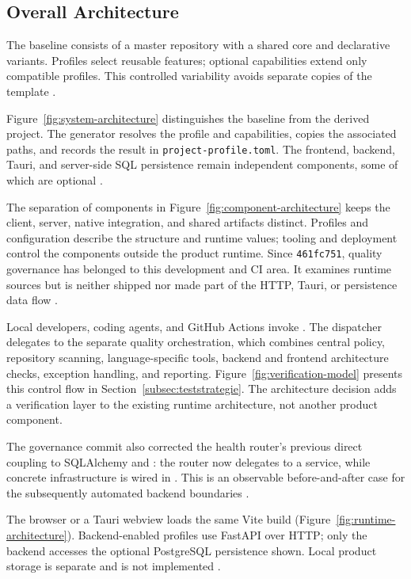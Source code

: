 \subsection{Overall Architecture}
\label{subsec:gesamtarchitektur}

The baseline consists of a master repository with a shared core and declarative
variants. Profiles select reusable features; optional capabilities extend only
compatible profiles. This controlled variability avoids separate copies of the
template
\parencite{clements2001software-product-lines,kleiveist2026profiles}.



Figure~\ref{fig:system-architecture} distinguishes the baseline from the derived
project. The generator resolves the profile and capabilities, copies the
associated paths, and records the result in
\texttt{project-profile.toml}. The frontend, backend, Tauri, and server-side SQL
persistence remain independent components, some of which are optional
\parencite{kleiveist2026architecture,kleiveist2026persistence}.



The separation of components in Figure~\ref{fig:component-architecture} keeps
the client, server, native integration, and shared artifacts distinct. Profiles
and configuration describe the structure and runtime values; tooling and
deployment control the components outside the product runtime. Since
\texttt{461fc751}, quality governance has belonged to this development and CI
area. It examines runtime sources but is neither shipped nor made part of the
HTTP, Tauri, or persistence data flow
\parencite{kleiveist2026governance-snapshot}.

Local developers, coding agents, and GitHub Actions invoke
. The dispatcher delegates to the separate quality
orchestration, which combines central policy, repository scanning,
language-specific tools, backend and frontend architecture checks, exception
handling, and reporting. Figure~\ref{fig:verification-model} presents this
control flow in Section~\ref{subsec:teststrategie}. The architecture decision
adds a verification layer to the existing runtime architecture, not another
product component.

The governance commit also corrected the health router's previous direct
coupling to SQLAlchemy and : the router now delegates to a service,
while concrete infrastructure is wired in . This is
an observable before-and-after case for the subsequently automated backend
boundaries \parencite{kleiveist2026governance-commit}.



The browser or a Tauri webview loads the same Vite build
(Figure~\ref{fig:runtime-architecture}). Backend-enabled profiles use FastAPI
over HTTP; only the backend accesses the optional PostgreSQL persistence shown.
Local product storage is separate and is not implemented
\parencite{kleiveist2026persistence}.
